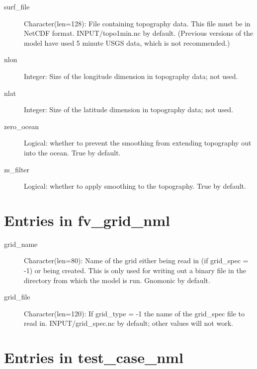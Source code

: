 \documentclass[12pt,letterpaper]{book}
\begin{document}
\begin{description}

\item[surf\_file] Character(len=128): File containing topography data. This file must be in NetCDF format. INPUT/topo1min.nc by default. 
(Previous versions of the model have used 5 minute USGS data, which is not recommended.) 


\item[nlon] Integer: Size of the longitude dimension in topography data; not used. 


\item[nlat] Integer: Size of the latitude dimension in topography data; not used. 


\item[zero\_ocean] Logical: whether to prevent the smoothing from extending topography out into the ocean. True by default. 


\item[zs\_filter] Logical: whether to apply smoothing to the topography. True by default. 



\end{description}

\section{Entries in fv\_grid\_nml}


\begin{description}

\item[grid\_name] Character(len=80): Name of the grid either being read in 
(if grid\_spec = -1) or being created. This is only used for writing out a binary file in the directory from which the model is run. 
Gnomonic by default. 


\item[grid\_file] Character(len=120): If grid\_type = -1 the name of the grid\_spec file to read in. INPUT/grid\_spec.nc by default; other values will not work. 


\end{description}

\section{Entries in test\_case\_nml}
\end{document}
